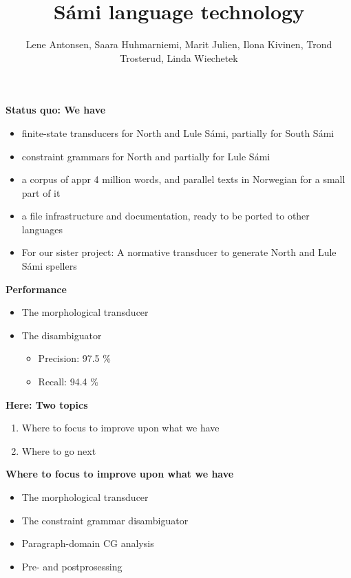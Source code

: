 \documentclass[landscape,english,11pt]{seminar}
\title{Sámi language technology}
\author{Lene Antonsen, 
Saara Huhmarniemi, 
Marit Julien, 
Ilona Kivinen, 
Trond Trosterud, 
Linda Wiechetek}
\begin{document}
\begin{slide}

\maketitle

\newslide
\textbf{Status quo: We have}
\begin{itemize}
\item finite-state transducers for North and Lule Sámi, partially for South Sámi
\item constraint grammars for North and partially for Lule Sámi
\item a corpus of appr 4 million words, and parallel texts in Norwegian for a small part of it
\item a file infrastructure and documentation, ready to be ported to other languages
\item For our sister project: A normative transducer to generate North and Lule Sámi spellers
\end{itemize}


\newslide
\textbf{Performance}
\begin{itemize}
\item The morphological transducer
\item The disambiguator
\begin{itemize}
\item Precision: 97.5 \%
\item Recall: 94.4 \%
\end{itemize}
\end{itemize}

\newslide
\textbf{Here: Two topics}
\begin{enumerate}
\item Where to focus to improve upon what we have
\item Where to go next
\end{enumerate}


\newslide
\textbf{Where to focus to improve upon what we have}
\begin{itemize}
\item The morphological transducer
\item The constraint grammar disambiguator
\item Paragraph-domain CG analysis
\item Pre- and postprosessing
\end{itemize}




\end{slide}
\end{document}
